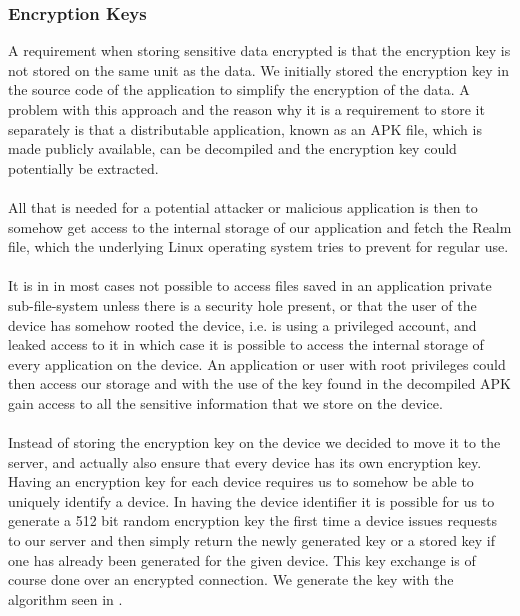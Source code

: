 \subsubsection{Encryption Keys}
\label{sub:encryption_keys}
A requirement when storing sensitive data encrypted is that the encryption key is not stored on the same unit as the data. We initially stored the encryption key in the source code of the application to simplify the encryption of the data. A problem with this approach and the reason why it is a requirement to store it separately is that a distributable application, known as an APK file, which is made publicly available, can be decompiled and the encryption key could potentially be extracted. 
\\\\
All that is needed for a potential attacker or malicious application is then to somehow get access to the internal storage of our application and fetch the Realm file, which the underlying Linux operating system tries to prevent for regular use. 
\\\\
It is in in most cases not possible to access files saved in an application private sub-file-system unless there is a security hole present, or that the user of the device has somehow rooted the device, i.e. is using a privileged account, and leaked access to it in which case it is possible to access the internal storage of every application on the device. An application or user with root privileges could then access our storage and with the use of the key found in the decompiled APK gain access to all the sensitive information that we store on the device.
\\\\
Instead of storing the encryption key on the device we decided to move it to the server, and actually also ensure that every device has its own encryption key. Having an encryption key for each device requires us to somehow be able to uniquely identify a device. 
In having the device identifier it is possible for us to generate a 512 bit random encryption key the first time a device issues requests to our server and then simply return the newly generated key or a stored key if one has already been generated for the given device. This key exchange is of course done over an encrypted connection. We generate the key with the algorithm seen in . 



